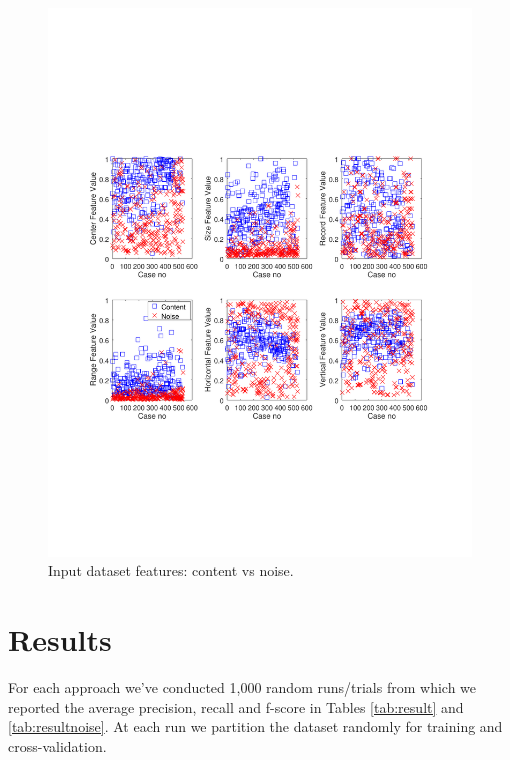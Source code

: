 \begin{figure}[h]
  \centering
     \includegraphics[trim={2.0cm 7.4cm 0.7cm 7.4cm}, clip,  width=\columnwidth]{img/dataset.pdf}
  \caption{Input dataset features: content vs noise.}
  \label{fig:dataset}
\end{figure}

\section{Results}
For each approach we've conducted 1,000 random runs/trials from which we
reported the average precision, recall and f-score in Tables \ref{tab:result} and
\ref{tab:resultnoise}.
At each run we partition the dataset randomly for training and cross-validation.

